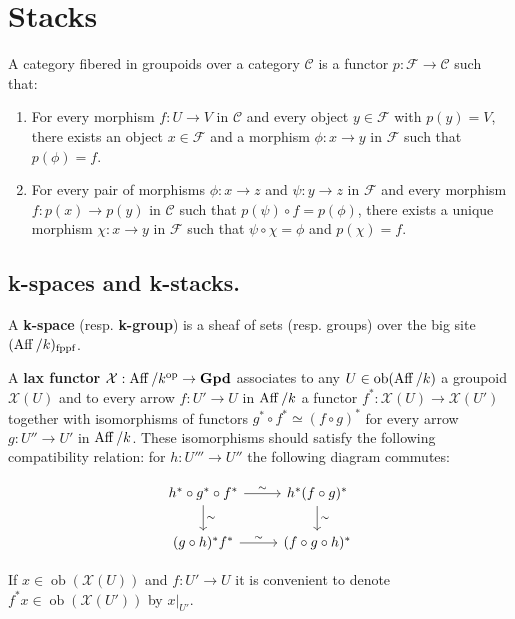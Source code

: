 \documentclass[12pt]{article}
\begin{document}
\section{Stacks}

\begin{definition}
    A category fibered in groupoids over a category $\mathcal{C}$ is a functor $p: \mathcal{F} \to \mathcal{C}$ such that:
    \begin{enumerate}
        \item For every morphism $f: U \to V$ in $\mathcal{C}$ and every object $y \in \mathcal{F}$ with $p(y) = V$, there exists an object $x \in \mathcal{F}$ and a morphism $\phi: x \to y$ in $\mathcal{F}$ such that $p(\phi) = f$.

        \item For every pair of morphisms $\phi: x \to z$ and $\psi: y \to z$ in $\mathcal{F}$ and every morphism $f: p(x) \to p(y)$ in $\mathcal{C}$ such that $p(\psi) \circ f = p(\phi)$, there exists a unique morphism $\chi: x \to y$ in $\mathcal{F}$ such that $\psi \circ \chi = \phi$ and $p(\chi) = f$.
    \end{enumerate}
\end{definition}

\subsection{k-spaces and k-stacks.}
\begin{definition}
    A \textbf{k-space} (resp. \textbf{k-group}) is a sheaf of sets (resp. groups) over the big site $(\operatorname{Aff}/k)_{\text{fppf}}$.

\end{definition}
\begin{definition}
    A \textbf{lax functor} $\mathcal{X}:\operatorname{Aff}/k^{\text{op}}\to \mathbf{Gpd}$ associates to any $U \in \operatorname{ob}(\operatorname{Aff}/k)$ a groupoid $\mathcal{X}(U)$ and to every arrow $f: U' \to U$ in $\operatorname{Aff}/k$ a functor $f^*: \mathcal{X}(U) \to \mathcal{X}(U')$ together with isomorphisms of functors
    $g^* \circ f^* \simeq (f \circ g)^*$ for every arrow $g: U'' \to U'$ in $\operatorname{Aff}/k$. These isomorphisms should satisfy the following compatibility relation:
    for $h: U''' \to U''$ the following diagram commutes:

    \[
        \begin{tikzcd}
            h^* \circ g^* \circ f^* \arrow[r, "\sim"] \arrow[d, "\sim"] & h^*(f \circ g)^* \arrow[d, "\sim"] \\
            (g \circ h)^* f^* \arrow[r, "\sim"] & (f \circ g \circ h)^*
        \end{tikzcd}
    \]
\end{definition}
If $x \in \operatorname{ob}(\mathcal{X}(U))$ and $f: U' \to U$ it is convenient to denote $f^*x \in \operatorname{ob}(\mathcal{X}(U'))$ by $x|_{U'}$.
\end{document}
